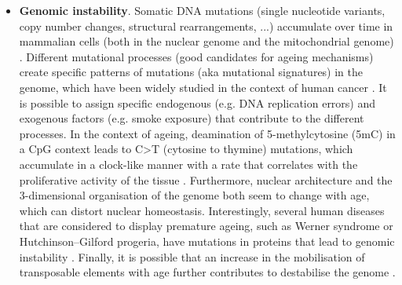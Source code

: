 \begin{itemize}
	
	\item \textbf{Genomic instability}. Somatic DNA mutations (single nucleotide variants, copy number changes, structural rearrangements, ...) accumulate over time in mammalian cells (both in the nuclear genome and the mitochondrial genome) \cite{Martincorena2018,Larsson2010}. Different mutational processes (good candidates for ageing mechanisms) create specific patterns of mutations (aka mutational signatures) in the genome, which have been widely studied in the context of human cancer \cite{Alexandrov2014}. It is possible to assign specific endogenous (e.g. DNA replication errors) and exogenous factors (e.g. smoke exposure) that contribute to the different processes. In the context of ageing, deamination of 5-methylcytosine (\acrshort{5mC}) in a \acrshort{CpG} context leads to C>T (cytosine to thymine) mutations, which accumulate in a clock-like manner with a rate that correlates with the proliferative activity of the tissue \cite{Alexandrov2015}. Furthermore, nuclear architecture and the 3-dimensional organisation of the genome both seem to change with age, which can distort nuclear homeostasis. Interestingly, several human diseases that are considered to display premature ageing, such as Werner syndrome or Hutchinson–Gilford progeria, have mutations in proteins that lead to genomic instability \cite{Oberdoerffer2007}. Finally, it is possible that an increase in the mobilisation of transposable elements with age further contributes to destabilise the genome \cite{Orr2016}.
	

\end{itemize}
